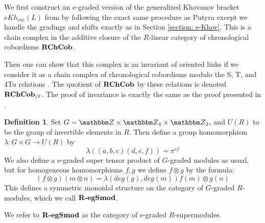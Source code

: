 \documentclass{amsart}
\theoremstyle{plain}
\theoremstyle{definition}
\newtheorem{definition}[theorem]{Definition}
\theoremstyle{definition}
\numberwithin{equation}{section}
\numberwithin{theorem}{section}
\newcommand{\cat}[1]{\ensuremath{\mbox{\bfseries {\upshape {#1}}}}}
\renewcommand{\to}{\rightarrow}
\numberwithin{equation}{section}
\def\Z{{\mathbbm Z}}
\begin{document}
We first construct an e-graded version of the generalized Khovanov bracket $eKh_{cov}(L)$ from \cite[Definition 5.9]{P} by following the exact same procedure as Putyra except we handle the gradings and shifts exactly as in Section \ref{section: e-Khov}.
This is a chain complex in the additive closure of the $R$-linear category of chronological cobordisms $\cat{RChCob}$.

Then one can show that this complex is an invariant of oriented links if we consider it as a chain complex of chronological cobordisms modulo the S, T, and 4Tu relations \cite[Section 7]{P}.
The quotient of $\cat{RChCob}$ by these relations is denoted $\cat{RChCob}_{/\ell}$.
The proof of invariance is exactly the same as the proof presented in \cite[Section 7]{P}.


\begin{definition}{\cite[Definition 10.1]{P}}
  Set $G=\Z\times \Z_4 \times \Z_2$, and $U(R)$ to be the group of invertible elements in $R$. Then define a group homomorphism $\lambda: G \times G \to U(R)$ by
  \[
  \lambda((a,b,c)(d,e,f))=\pi^{cf}
  \]
  We also define a e-graded super tensor product of $G$-graded modules as usual, but for homogeneous homomorphisms $f,g$ we define $f\otimes g$ by the formula:
  \[
  (f\otimes g)(m\otimes n) = \lambda(deg(g), deg(m))f(m)\otimes g(n)
  \]
  This defines a symmetric monoidal structure on the category of $G$-graded $R$-modules, which we call $\cat{R-egSmod}$.
\end{definition}
%
We refer to $\cat{R-egSmod}$ as the category of e-graded $R$-supermodules.
%
\end{document}
